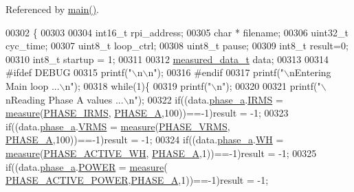 Referenced by \hyperlink{a00035_source_l00198}{main()}.


\begin{DoxyCode}
00302                        \{
00303 
00304   int16\_t   rpi\_address; 
00305   \textcolor{keywordtype}{char} *    filename;
00306   uint32\_t  cyc\_time;
00307   uint8\_t   loop\_ctrl;
00308   uint8\_t   pause;
00309   int8\_t    result=0;
00310   int8\_t startup = 1;
00311   
00312     \hyperlink{a00029}{measured\_data\_t} data;
00313     
00314 \textcolor{preprocessor}{        #ifdef DEBUG }
00315 \textcolor{preprocessor}{}        printf(\textcolor{stringliteral}{"\(\backslash\)n\(\backslash\)n"});
00316 \textcolor{preprocessor}{        #endif  }
00317 \textcolor{preprocessor}{}         printf(\textcolor{stringliteral}{"\(\backslash\)nEntering Main loop ...\(\backslash\)n"});
00318          \textcolor{keywordflow}{while}(1)\{  
00319          printf(\textcolor{stringliteral}{"\(\backslash\)n"});
00320          
00321          printf(\textcolor{stringliteral}{"\(\backslash\)nReading Phase A values ...\(\backslash\)n"});   
00322          \textcolor{keywordflow}{if}((data.\hyperlink{a00029_ad7205e9853a503d2fab0697f5a301f6c}{phase\_a}.\hyperlink{a00030_a4f87f30b543e89e2e5dfa1b8f3f58eff}{IRMS}           = \hyperlink{a00009_gac914ebaa64afce03ee852af09659cf69}{measure}(\hyperlink{a00043_a15c9ccf287820001431c33c4bb25a23b}{PHASE\_IRMS},
      \hyperlink{a00043_ad214039f52b011ce2bd6c85ff98a981b}{PHASE\_A},100))==-1)result = -1;
00323          \textcolor{keywordflow}{if}((data.\hyperlink{a00029_ad7205e9853a503d2fab0697f5a301f6c}{phase\_a}.\hyperlink{a00030_a08415029e214174a01bc6487ff98ee9b}{VRMS}           = \hyperlink{a00009_gac914ebaa64afce03ee852af09659cf69}{measure}(\hyperlink{a00043_af0c09c5a455410e6fbd35fd55221338f}{PHASE\_VRMS},
      \hyperlink{a00043_ad214039f52b011ce2bd6c85ff98a981b}{PHASE\_A},100))==-1)result = -1;
00324          \textcolor{keywordflow}{if}((data.\hyperlink{a00029_ad7205e9853a503d2fab0697f5a301f6c}{phase\_a}.\hyperlink{a00030_a8dd6d8406db4e214238b3eff481e4ea0}{WH}           = \hyperlink{a00009_gac914ebaa64afce03ee852af09659cf69}{measure}(\hyperlink{a00043_a4ee773ad07fa969b9990f9bb3a1a2093}{PHASE\_ACTIVE\_WH},
      \hyperlink{a00043_ad214039f52b011ce2bd6c85ff98a981b}{PHASE\_A},1))==-1)result = -1;
00325          \textcolor{keywordflow}{if}((data.\hyperlink{a00029_ad7205e9853a503d2fab0697f5a301f6c}{phase\_a}.\hyperlink{a00030_a8a9794fa4c6a69b457d1eb04b017ef1e}{POWER}         = \hyperlink{a00009_gac914ebaa64afce03ee852af09659cf69}{measure}(
      \hyperlink{a00043_abd3f95c7cd63d0627552d293bf49e026}{PHASE\_ACTIVE\_POWER},\hyperlink{a00043_ad214039f52b011ce2bd6c85ff98a981b}{PHASE\_A},1))==-1)result = -1;

\end{DoxyCode}
